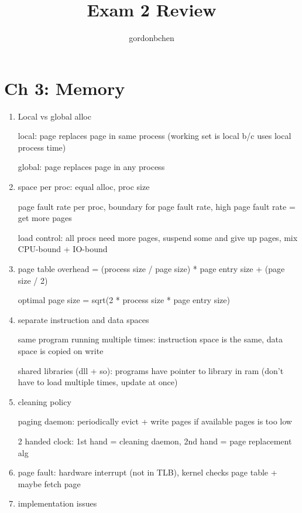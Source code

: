 \documentclass[10pt]{article}
\title{Exam 2 Review}
\author{gordonbchen}
\date{}
\begin{document}
\maketitle


\section{Ch 3: Memory}

\begin{enumerate}
    \item Local vs global alloc

        local: page replaces page in same process (working set is local b/c uses local process time)

        global: page replaces page in any process

    \item space per proc: equal alloc, proc size

        page fault rate per proc, boundary for page fault rate, high page fault rate = get more pages

        load control: all procs need more pages, suspend some and give up pages, mix CPU-bound + IO-bound

    \item page table overhead = (process size / page size) * page entry size + (page size / 2)

        optimal page size = sqrt(2 * process size * page entry size)

    \item separate instruction and data spaces

        same program running multiple times: instruction space is the same, data space is copied on write

        shared libraries (dll + so): programs have pointer to library in ram (don't have to load multiple times, update at once)

    \item cleaning policy

        paging daemon: periodically evict + write pages if available pages is too low

        2 handed clock: 1st hand = cleaning daemon, 2nd hand = page replacement alg

    \item page fault: hardware interrupt (not in TLB), kernel checks page table + maybe fetch page

    \item implementation issues


\end{enumerate}
\end{document}
